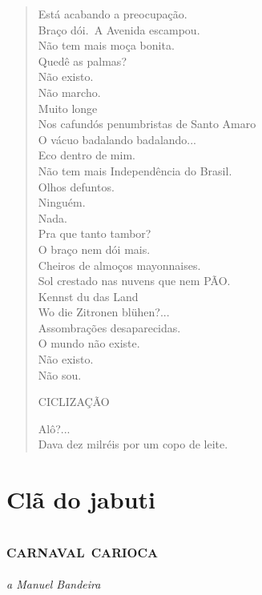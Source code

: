 \begin{verse}
Está acabando a preocupação.\\
Braço dói.\
A Avenida escampou.\\
Não tem mais moça bonita.\\
Quedê as palmas?\\
Não existo.\\
Não marcho.\\
Muito longe\\
Nos cafundós penumbristas de Santo Amaro\\
O vácuo badalando badalando...\\
Eco dentro de mim.\\
Não tem mais Independência do Brasil.\\
Olhos defuntos.\\
Ninguém.\\
Nada.\\
Pra que tanto tambor?\\
O braço nem dói mais.\\
Cheiros de almoços mayonnaises.\\
Sol crestado nas nuvens que nem PÃO.\\
Kennst du das Land\\
Wo die Zitronen blühen?...\\
Assombrações desaparecidas.\\
O mundo não existe.\\
Não existo.\\
Não sou.

CICLIZAÇÃO

Alô?...\\
Dava dez milréis por um copo de leite.
\end{verse}

\part{Clã do jabuti}

\chapter[Carnaval carioca]{\textsc{carnaval carioca} }

\hfill\emph{a Manuel Bandeira}

